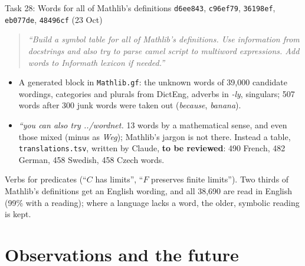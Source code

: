 \documentclass[10pt,aspectratio=169]{beamer}
\newcommand{\bad}[1]{\textcolor{warn}{#1}}
\newcommand{\commit}[1]{\texttt{\footnotesize #1}}
\newcommand{\prompt}[1]{\begin{quote}\small\itshape ``#1''\end{quote}}
\begin{document}
\begin{frame}{Task 28: Words for all of Mathlib's definitions}
  \commit{d6ee843}, \commit{c96ef79}, \commit{36198ef}, \commit{eb077de}, \commit{48496cf} (23 Oct)
  \prompt{Build a symbol table for all of Mathlib's definitions. Use information from
  docstrings and also try to parse camel script to multiword expressions. Add words to
  Informath lexicon if needed.}
  \begin{itemize}\small
    \item A generated block in \texttt{Mathlib.gf}: the unknown words of 39,000 candidate
          wordings, categories and plurals from DictEng, adverbs in \emph{-ly}, singulars;
          507 words after 300 junk words were taken out (\emph{because}, \emph{banana}).
    \item \textit{``you can also try ../wordnet.} 13 words by a mathematical sense, and even
          those mixed (minus as \bad{\emph{Weg}}); Mathlib's jargon is not there.
          Instead a table, \texttt{translations.tsv}, written by Claude, \textbf{to be
          reviewed}: 490 French, 482 German, 458 Swedish, 458 Czech words.
  \end{itemize}
  Verbs for predicates (``$C$ has limits'', ``$F$ preserves finite limits''). Two thirds of
  Mathlib's definitions get an English wording, and all 38,690 are read in English (99\% with a
  reading); where a language lacks a word, the older, symbolic reading is kept.
\end{frame}

\section{Observations and the future}
\end{document}
